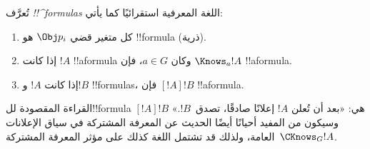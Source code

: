 \documentclass[../../../include/open-logic-section]{subfiles}
\begin{document}
\begin{defn}
  تُعرَّف \emph{!!^{formula}s} اللغة المعرفية استقرائيًا كما يأتي:
  \begin{enumerate}


  \item كل متغير قضي $\Obj p_i$ هو !!{formula} (ذرية).






  \item إذا كانت $!A$ !!a{formula} وكان $a \in G$، فإن $\Knows_a !A$
  !!a{formula}.
  
  \item إذا كانت $!A$ و$!B$ !!{formula}s، فإن $[!A] !B$ !!a{formula}.

\end{enumerate}
\end{defn}

القراءة المقصودة لل!!{formula} $[!A] !B$ هي: «بعد أن تُعلن $!A$
إعلانًا صادقًا، تصدق~$!B$.» وسيكون من المفيد أحيانًا أيضًا الحديث عن
المعرفة المشتركة في سياق الإعلانات العامة، ولذلك قد تشتمل اللغة كذلك
على مؤثر المعرفة المشتركة~$\CKnows_G !A$.
\end{document}
